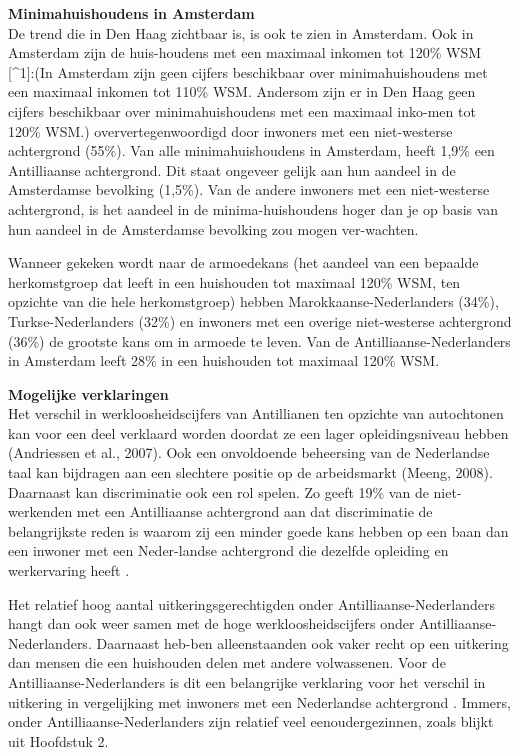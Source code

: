 \documentclass[]{book}
\begin{document}
\textbf{Minimahuishoudens in Amsterdam}\\
De trend die in Den Haag zichtbaar is, is ook te zien in Amsterdam. Ook
in Amsterdam zijn de huis-houdens met een maximaal inkomen tot 120\% WSM
{[}\^{}1{]}:(In Amsterdam zijn geen cijfers beschikbaar over
minimahuishoudens met een maximaal inkomen tot 110\% WSM. Andersom zijn
er in Den Haag geen cijfers beschikbaar over minimahuishoudens met een
maximaal inko-men tot 120\% WSM.) oververtegenwoordigd door inwoners met
een niet-westerse achtergrond (55\%). Van alle minimahuishoudens in
Amsterdam, heeft 1,9\% een Antilliaanse achtergrond. Dit staat ongeveer
gelijk aan hun aandeel in de Amsterdamse bevolking (1,5\%). Van de
andere inwoners met een niet-westerse achtergrond, is het aandeel in de
minima-huishoudens hoger dan je op basis van hun aandeel in de
Amsterdamse bevolking zou mogen ver-wachten.

Wanneer gekeken wordt naar de armoedekans (het aandeel van een bepaalde
herkomstgroep dat leeft in een huishouden tot maximaal 120\% WSM, ten
opzichte van die hele herkomstgroep) hebben Marokkaanse-Nederlanders
(34\%), Turkse-Nederlanders (32\%) en inwoners met een overige
niet-westerse achtergrond (36\%) de grootste kans om in armoede te
leven. Van de Antilliaanse-Nederlanders in Amsterdam leeft 28\% in een
huishouden tot maximaal 120\% WSM.

\textbf{Mogelijke verklaringen}\\
Het verschil in werkloosheidscijfers van Antillianen ten opzichte van
autochtonen kan voor een deel verklaard worden doordat ze een lager
opleidingsniveau hebben (Andriessen et al., 2007). Ook een onvoldoende
beheersing van de Nederlandse taal kan bijdragen aan een slechtere
positie op de arbeidsmarkt (Meeng, 2008). Daarnaast kan discriminatie
ook een rol spelen. Zo geeft 19\% van de niet-werkenden met een
Antilliaanse achtergrond aan dat discriminatie de belangrijkste reden is
waarom zij een minder goede kans hebben op een baan dan een inwoner met
een Neder-landse achtergrond die dezelfde opleiding en werkervaring
heeft \citep{Andriessen2007}.

Het relatief hoog aantal uitkeringsgerechtigden onder
Antilliaanse-Nederlanders hangt dan ook weer samen met de hoge
werkloosheidscijfers onder Antilliaanse-Nederlanders. Daarnaast heb-ben
alleenstaanden ook vaker recht op een uitkering dan mensen die een
huishouden delen met andere volwassenen. Voor de
Antilliaanse-Nederlanders is dit een belangrijke verklaring voor het
verschil in uitkering in vergelijking met inwoners met een Nederlandse
achtergrond \citep{Huijnk2013}. Immers, onder Antilliaanse-Nederlanders
zijn relatief veel eenoudergezinnen, zoals blijkt uit Hoofdstuk 2.
\end{document}
